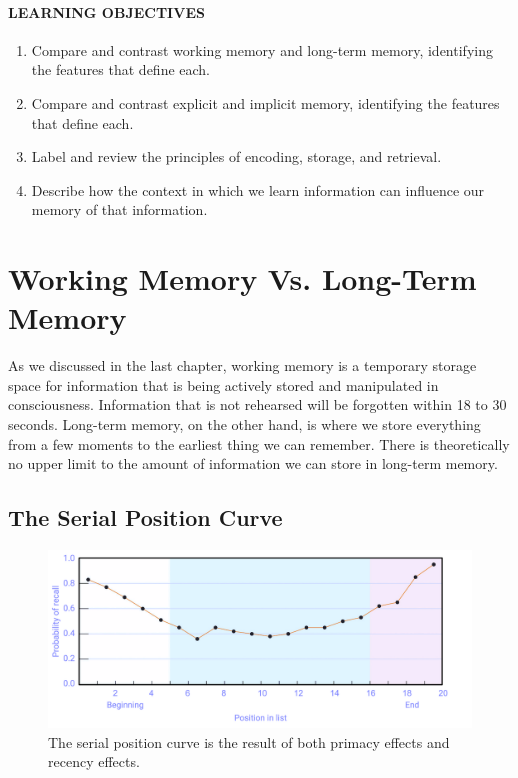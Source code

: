 \documentclass[
]{krantz}
\providecommand{\tightlist}{%
  \setlength{\itemsep}{0pt}\setlength{\parskip}{0pt}}
\begin{document}
\paragraph*{LEARNING OBJECTIVES}\label{learning-objectives-4}

\begin{enumerate}
\def\labelenumi{\arabic{enumi}.}
\tightlist
\item
  Compare and contrast working memory and long-term memory, identifying the features that define each.
\item
  Compare and contrast explicit and implicit memory, identifying the features that define each.
\item
  Label and review the principles of encoding, storage, and retrieval.
\item
  Describe how the context in which we learn information can influence our memory of that information.
\end{enumerate}

\section{Working Memory Vs. Long-Term Memory}\label{working-memory-vs.-long-term-memory}

As we discussed in the last chapter, working memory is a temporary storage space for information that is being actively stored and manipulated in consciousness. Information that is not rehearsed will be forgotten within 18 to 30 seconds. Long-term memory, on the other hand, is where we store everything from a few moments to the earliest thing we can remember. There is theoretically no upper limit to the amount of information we can store in long-term memory.

\subsection*{The Serial Position Curve}\label{the-serial-position-curve}


\begin{figure}

{\centering \includegraphics[width=0.8\linewidth]{images/ch5/fig1} 

}

\caption{The serial position curve is the result of both primacy effects and recency effects.}\label{fig:serialposition}
\end{figure}
\end{document}
